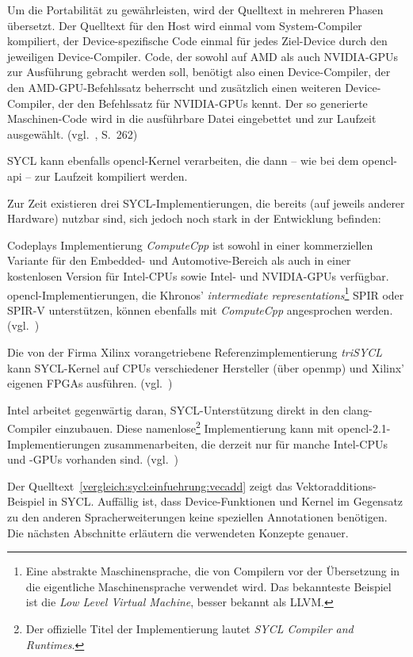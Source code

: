 Um die Portabilität zu gewährleisten, wird der Quelltext in mehreren Phasen
übersetzt. Der Quelltext für den Host wird einmal vom System-Compiler
kompiliert, der Device-spezifische Code einmal für jedes Ziel-Device durch den
jeweiligen Device-Compiler. Code, der sowohl auf AMD als auch NVIDIA-GPUs
zur Ausführung gebracht werden soll, benötigt also einen Device-Compiler,
der den AMD-GPU-Befehlssatz beherrscht und zusätzlich einen weiteren
Device-Compiler, der den Befehlssatz für NVIDIA-GPUs kennt. Der so generierte
Maschinen-Code wird in die ausführbare Datei eingebettet und zur Laufzeit
ausgewählt. (vgl.~\cite{syclspec}, S.\ 262)

SYCL kann ebenfalls \gls{opencl}-Kernel verarbeiten, die dann -- wie bei dem
\gls{opencl}-\gls{api} -- zur Laufzeit kompiliert werden.

Zur Zeit existieren drei SYCL-Implementierungen, die bereits (auf jeweils
anderer Hardware) nutzbar sind, sich jedoch noch stark in der Entwicklung
befinden:

Codeplays Implementierung \textit{ComputeCpp} ist sowohl in einer kommerziellen
Variante für den Embedded- und Automotive-Bereich als auch in einer kostenlosen
Version für Intel-CPUs sowie Intel- und NVIDIA-GPUs verfügbar.
\gls{opencl}-Implementierungen, die Khronos'
\textit{intermediate representations}\footnote{Eine abstrakte Maschinensprache,
die von Compilern vor der Übersetzung in die eigentliche Maschinensprache
verwendet wird. Das bekannteste Beispiel ist die
\textit{Low Level Virtual Machine}, besser bekannt als LLVM.} SPIR oder SPIR-V
unterstützen, können ebenfalls mit \textit{ComputeCpp} angesprochen werden.
(vgl.~\cite{computecpp})

Die von der Firma Xilinx vorangetriebene Referenzimplementierung
\textit{triSYCL} kann SYCL-Kernel auf CPUs verschiedener Hersteller (über
\gls{openmp}) und Xilinx' eigenen FPGAs ausführen.
(vgl.~\cite{trisycl})

Intel arbeitet gegenwärtig daran, SYCL-Unterstützung direkt in den
clang-Compiler einzubauen. Diese namenlose\footnote{Der offizielle Titel der
Implementierung lautet \textit{SYCL Compiler and Runtimes}.} Implementierung
kann mit \gls{opencl}-2.1-Implementierungen zusammenarbeiten, die derzeit nur
für manche Intel-CPUs und -GPUs vorhanden sind.
(vgl.~\cite{intelsycl})

Der Quelltext~\ref{vergleich:sycl:einfuehrung:vecadd} zeigt das
Vektoradditions-Beispiel in SYCL. Auffällig ist, dass Device-Funktionen und
Kernel im Gegensatz zu den anderen Spracherweiterungen keine speziellen
Annotationen benötigen. Die nächsten Abschnitte erläutern die verwendeten
Konzepte genauer.

